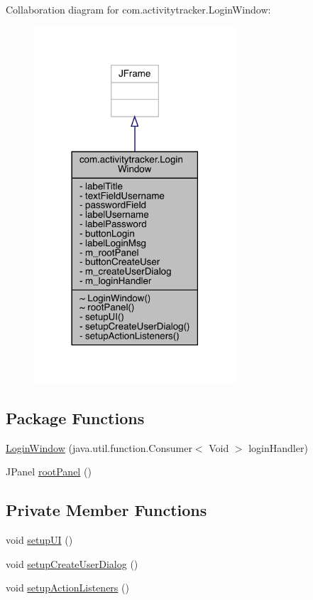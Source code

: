 Collaboration diagram for com.\+activitytracker.\+Login\+Window\+:
\nopagebreak
\begin{figure}[H]
\begin{center}
\leavevmode
\includegraphics[width=213pt]{classcom_1_1activitytracker_1_1_login_window__coll__graph}
\end{center}
\end{figure}
\subsection*{Package Functions}
\begin{DoxyCompactItemize}
\item 
\mbox{\hyperlink{classcom_1_1activitytracker_1_1_login_window_a137cce127ffa1660c70d3fddbc0e2a74}{Login\+Window}} (java.\+util.\+function.\+Consumer$<$ Void $>$ login\+Handler)
\item 
J\+Panel \mbox{\hyperlink{classcom_1_1activitytracker_1_1_login_window_ab1ea45e86bbb79bccd06531279f1e443}{root\+Panel}} ()
\end{DoxyCompactItemize}
\subsection*{Private Member Functions}
\begin{DoxyCompactItemize}
\item 
void \mbox{\hyperlink{classcom_1_1activitytracker_1_1_login_window_a7af9edf52b3028437e2159f0be9893a9}{setup\+UI}} ()
\item 
void \mbox{\hyperlink{classcom_1_1activitytracker_1_1_login_window_a567db7b15448fe9d9c76addbcee4092b}{setup\+Create\+User\+Dialog}} ()
\item 
void \mbox{\hyperlink{classcom_1_1activitytracker_1_1_login_window_af1ff236b841c51bfb49e143344a3c3ac}{setup\+Action\+Listeners}} ()
\end{DoxyCompactItemize}
